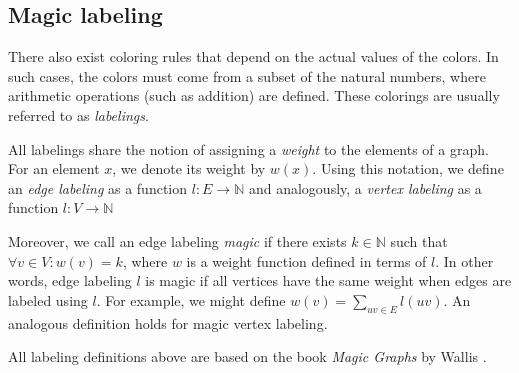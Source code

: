 \subsection{Magic labeling}

There also exist coloring rules that depend on the actual values of the colors. In such cases, the colors must come from a subset of the natural numbers, where arithmetic operations (such as addition) are defined. These colorings are usually referred to as \textit{labelings}.

All labelings share the notion of assigning a \textit{weight} to the elements of a graph. For an element $x$, we denote its weight by $w(x)$. Using this notation, we define an \textit{edge labeling} as a function $l : E \rightarrow \mathbb{N}$ and analogously, a \textit{vertex labeling} as a function $l : V \rightarrow \mathbb{N}$

Moreover, we call an edge labeling \textit{magic} if there exists $k \in \mathbb{N}$ such that $\forall v \in V: w(v) = k$, where $w$ is a weight function defined in terms of $l$. In other words, edge labeling $l$ is magic if all vertices have the same weight when edges are labeled using $l$. For example, we might define $w(v) = \sum_{uv \in E} l(uv)$. An analogous definition holds for magic vertex labeling.

All labeling definitions above are based on the book \textit{Magic Graphs} by Wallis \cite{marrwall2013}.